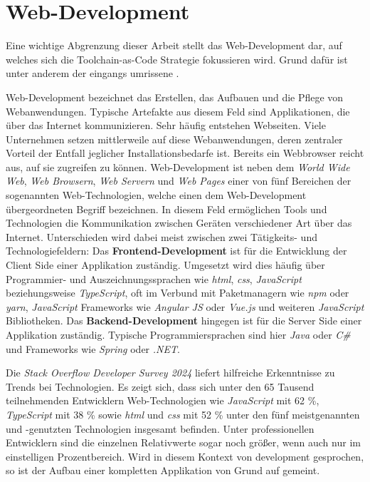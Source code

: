 \section{Web-Development}
\label{sec:02-01_web-development}

Eine wichtige Abgrenzung dieser Arbeit stellt das Web-Development dar, auf welches sich die Toolchain-as-Code Strategie fokussieren wird. Grund dafür ist unter anderem der eingangs umrissene .

Web-Development bezeichnet das Erstellen, das Aufbauen und die Pflege von Webanwendungen. Typische Artefakte aus diesem Feld sind Applikationen, die über das Internet kommunizieren. Sehr häufig entstehen Webseiten. \cite{209:Web-Development} Viele Unternehmen setzen mittlerweile auf diese Webanwendungen, deren zentraler Vorteil der Entfall jeglicher Installationsbedarfe ist. Bereits ein Webbrowser reicht aus, auf sie zugreifen zu können. \cite{002:Optimizing-Cloud-Applications-with-DevOps} Web-Development ist neben dem \textit{World Wide Web}, \textit{Web Browsern}, \textit{Web Servern} und \textit{Web Pages} einer von fünf Bereichen der sogenannten Web-Technologien, welche einen dem Web-Development übergeordneten Begriff bezeichnen. In diesem Feld ermöglichen Tools und Technologien die Kommunikation zwischen Geräten verschiedener Art über das Internet. Unterschieden wird dabei meist zwischen zwei Tätigkeits- und Technologiefeldern: Das \textbf{Frontend-Development} ist für die Entwicklung der Client Side einer Applikation zuständig. Umgesetzt wird dies häufig über Programmier- und Auszeichnungssprachen wie \textit{\Gls{html}}, \textit{\Gls{css}}, \textit{JavaScript} beziehungsweise \textit{TypeScript}, oft im Verbund mit Paketmanagern wie \textit{npm} oder \textit{yarn}, \textit{JavaScript} Frameworks wie \textit{Angular JS} oder \textit{Vue.js} und weiteren \textit{JavaScript} Bibliotheken. Das \textbf{Backend-Development} hingegen ist für die Server Side einer Applikation zuständig. Typische Programmiersprachen sind hier \textit{Java} oder \textit{C\#} und Frameworks wie \textit{Spring} oder \textit{.NET}. \cite{208:Web-Technology}

Die \textit{Stack Overflow Developer Survey 2024} liefert hilfreiche Erkenntnisse zu Trends bei Technologien. Es zeigt sich, dass sich unter den 65 Tausend teilnehmenden Entwicklern Web-Technologien wie \textit{JavaScript} mit 62 \%, \textit{TypeScript} mit 38 \% sowie \textit{\Gls{html}} und \textit{\Gls{css}} mit 52 \% unter den fünf meistgenannten und -genutzten Technologien insgesamt befinden. Unter professionellen Entwicklern sind die einzelnen Relativwerte sogar noch größer, wenn auch nur im einstelligen Prozentbereich. \cite{206:Developer-Survey-2024} Wird in diesem Kontext von \Gls{development} gesprochen, so ist der Aufbau einer kompletten Applikation von Grund auf gemeint.


